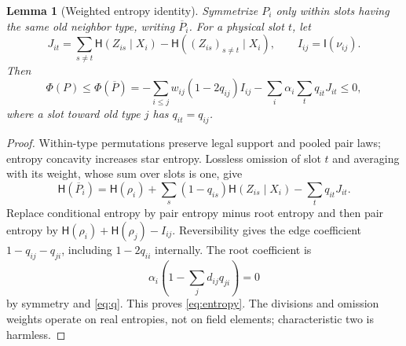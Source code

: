 \documentclass[11pt]{article}
\newtheorem{lemma}{Lemma}
\newcommand{\HH}{\mathsf H}
\newcommand{\II}{\mathsf I}
\begin{document}
\begin{lemma}[Weighted entropy identity]\label{lem:entropy}
Symmetrize $P_i$ only within slots having the same old neighbor type,
writing $\overline P_i$. For a physical slot $t$, let
\[
 J_{it}=\sum_{s\ne t}\HH(Z_{is}\mid X_i)
        -\HH((Z_{is})_{s\ne t}\mid X_i),
 \qquad I_{ij}=\II(\nu_{ij}).
\]
Then
\begin{equation}\label{eq:entropy}
 \Phi(P)\le\Phi(\overline P)
 =-\sum_{i\le j}w_{ij}(1-2q_{ij})I_{ij}
  -\sum_i\alpha_i\sum_tq_{it}J_{it}\le0,
\end{equation}
where a slot toward old type $j$ has $q_{it}=q_{ij}$.
\end{lemma}
\begin{proof}
Within-type permutations preserve legal support and pooled pair laws;
entropy concavity increases star entropy. Lossless omission of slot $t$
and averaging with its weight, whose sum over slots is one, give
\[
 \HH(\overline P_i)=\HH(\rho_i)
   +\sum_s(1-q_{is})\HH(Z_{is}\mid X_i)-\sum_tq_{it}J_{it}.
\]
Replace conditional entropy by pair entropy minus root entropy and then
pair entropy by $\HH(\rho_i)+\HH(\rho_j)-I_{ij}$.
Reversibility gives the edge coefficient $1-q_{ij}-q_{ji}$,
including $1-2q_{ii}$ internally. The root coefficient is
\[
 \alpha_i\left(1-\sum_jd_{ij}q_{ji}\right)=0
\]
by symmetry and \eqref{eq:q}. This proves \eqref{eq:entropy}.
The divisions and omission weights operate on real entropies, not on
field elements; characteristic two is harmless.
\end{proof}
\end{document}
